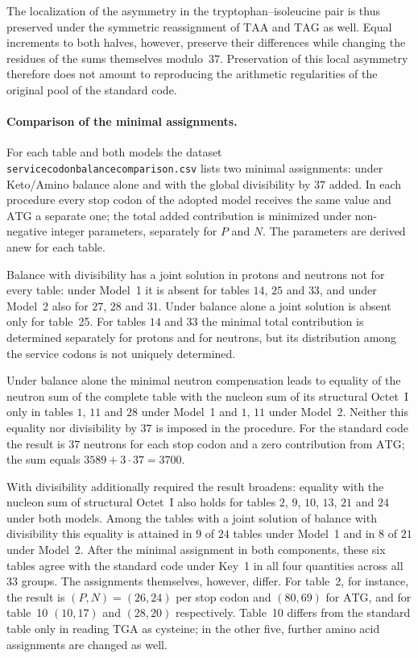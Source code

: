 \documentclass[11pt,a4paper]{article}
\renewcommand{\_}{\origunderscore\allowbreak}
\begin{document}
The localization of the asymmetry in the tryptophan--isoleucine
pair is thus preserved under the symmetric reassignment of
$\mathrm{TAA}$ and
$\mathrm{TAG}$ as well. Equal increments to both halves, however,
preserve
their differences while changing the residues of the sums
themselves modulo~$37$. Preservation of this local asymmetry
therefore does not amount to reproducing the arithmetic
regularities of the original pool of the standard code.

\paragraph{Comparison of the minimal assignments.}
For each table and both models the dataset
\texttt{service\_codon\_balance\_comparison.csv} lists two
minimal assignments: under Keto/Amino balance alone and with the
global divisibility by $37$ added. In each procedure every stop
codon of the adopted model receives the same value and
$\mathrm{ATG}$ a
separate one; the total added contribution is minimized under
non-negative integer parameters, separately for $P$ and $N$. The
parameters are derived anew for each table.

Balance with divisibility has a joint solution in protons and
neutrons not for every table: under Model~1 it is absent for
tables $14$, $25$ and $33$, and under Model~2 also for $27$, $28$
and
$31$. Under balance alone a joint solution is absent only for
table~25. For tables $14$ and $33$ the minimal total contribution
is
determined separately for protons and for neutrons, but its
distribution among the service codons is not uniquely determined.

Under balance alone the minimal neutron compensation leads to
equality of the neutron sum of the complete table with the nucleon
sum of its structural Octet~I only in tables $1$, $11$ and $28$
under Model~1 and $1$, $11$ under Model~2. Neither this equality
nor divisibility by $37$ is imposed in the procedure. For the
standard code the result is $37$ neutrons for each stop codon and
a
zero contribution from $\mathrm{ATG}$; the sum equals
$3589+3\cdot37=3700$.

With divisibility additionally required the result broadens:
equality with the nucleon sum of structural Octet~I also holds for
tables $2$, $9$, $10$, $13$, $21$ and $24$ under both models.
Among
the tables with a joint solution of balance with divisibility this
equality is attained in $9$ of $24$ tables under Model~1 and in
$8$
of $21$ under Model~2. After the minimal assignment in both
components, these six tables agree with the standard code under
Key~1 in all four quantities across all $33$ groups. The
assignments themselves, however, differ. For table~2, for
instance, the result is $(P,N)=(26,24)$ per stop codon and
$(80,69)$ for $\mathrm{ATG}$, and
for table~10 $(10,17)$ and $(28,20)$ respectively. Table~10
differs from the
standard table only in reading $\mathrm{TGA}$ as cysteine; in the
other
five, further amino acid assignments are changed as well.
\end{document}
